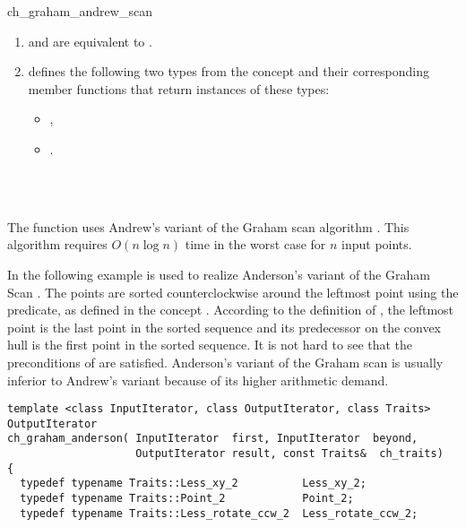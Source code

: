 \begin{ccRefFunction}{ch_graham_andrew_scan}
\begin{enumerate}
   \item    {} and 
            are equivalent to .
   \item    {} defines the following two types from
            the concept  and their corresponding member
            functions that return instances of these types:
            \begin{itemize}
                \item {},
                \item {}.
            \end{itemize}
\end{enumerate}


\ccSeeAlso

 \\
 \\

\ccImplementation

The function uses Andrew's 
variant of the Graham scan algorithm \cite{a-aeach-79} . This algorithm 
requires $O(n \log n)$ time in the worst case for $n$ input points.  

\ccExample

In the following example  is used to
realize Anderson's variant \cite{a-readc-78} of the Graham Scan 
\cite{g-eadch-72}.  The points are sorted counterclockwise around the leftmost 
point using the  predicate, as defined in
the concept . According to the definition 
of , the leftmost point is the last point in the sorted 
sequence and its predecessor on the convex hull is the first point in the 
sorted sequence.  It is not hard to see that the preconditions of
 are satisfied.  Anderson's variant of the 
Graham scan is usually inferior to Andrew's variant because of its higher 
arithmetic demand.

\begin{verbatim}
template <class InputIterator, class OutputIterator, class Traits>
OutputIterator
ch_graham_anderson( InputIterator  first, InputIterator  beyond,
                    OutputIterator result, const Traits&  ch_traits)
{
  typedef typename Traits::Less_xy_2          Less_xy_2;
  typedef typename Traits::Point_2            Point_2;
  typedef typename Traits::Less_rotate_ccw_2  Less_rotate_ccw_2;


\end{verbatim}
\end{ccRefFunction}

